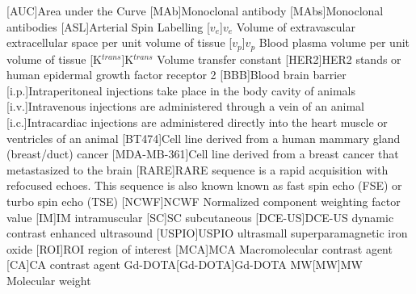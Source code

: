 \begin{acronym}
[AUC]{Area under the Curve}%
[MAb]{Monoclonal antibody}
[MAbs]{Monoclonal antibodies}
[ASL]{Arterial Spin Labelling}
[$v_e$]{$v_e$ Volume of extravascular extracellular space per unit volume of tissue}
[$v_p$]{$v_p$ Blood plasma volume per unit volume of tissue}
[K$^{trans}$]{K$^{trans}$ Volume transfer constant}
[HER2]{HER2 stands or human epidermal growth factor receptor 2}
[BBB]{Blood brain barrier}
[i.p.]{Intraperitoneal injections take place in the body cavity of animals}
[i.v.]{Intravenous injections are administered through a vein of an animal}
[i.c.]{Intracardiac injections are administered directly into the heart muscle or ventricles of an animal}
[BT474]{Cell line derived from a human mammary gland (breast/duct) cancer}
[MDA-MB-361]{Cell line derived from a breast cancer that metastasized to the brain}
[RARE]{RARE sequence is a rapid acquisition with refocused echoes. This sequence is also known known as fast spin echo (FSE) or turbo spin echo (TSE)}
[NCWF]{NCWF Normalized component weighting factor value}
[IM]{IM intramuscular}
[SC]{SC subcutaneous}
[DCE-US]{DCE-US dynamic contrast enhanced ultrasound}
[USPIO]{USPIO ultrasmall superparamagnetic iron oxide}
[ROI]{ROI region of interest}
[MCA]{MCA Macromolecular contrast agent}
[CA]{CA contrast agent}
\acs{Gd-DOTA}[Gd-DOTA]{Gd-DOTA}
\acs{MW}[MW]{MW Molecular weight}
\end{acronym}

% 
